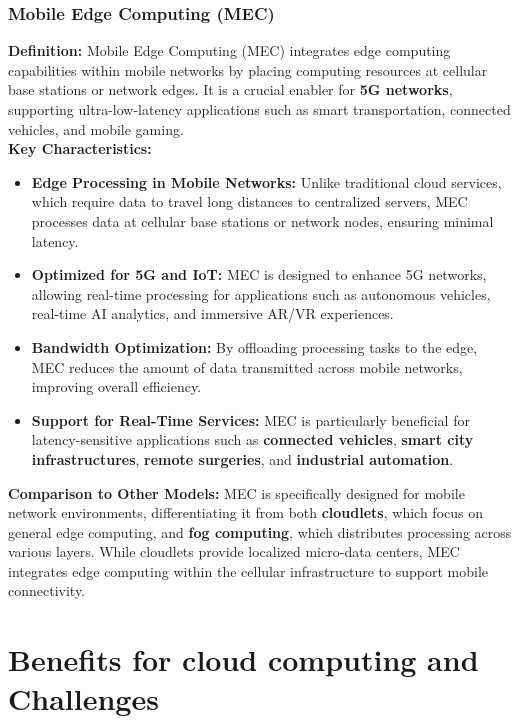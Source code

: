 \documentclass[runningheads]{llncs}
\begin{document}
\subsubsection{Mobile Edge Computing (MEC)}
\textbf{Definition:}  
Mobile Edge Computing (MEC) integrates edge computing capabilities within mobile networks by placing computing resources at cellular base stations or network edges. It is a crucial enabler for \textbf{5G networks}, supporting ultra-low-latency applications such as smart transportation, connected vehicles, and mobile gaming.
\\
\textbf{Key Characteristics:}
\begin{itemize}
    \item \textbf{Edge Processing in Mobile Networks:} Unlike traditional cloud services, which require data to travel long distances to centralized servers, MEC processes data at cellular base stations or network nodes, ensuring minimal latency.
    \item \textbf{Optimized for 5G and IoT:} MEC is designed to enhance 5G networks, allowing real-time processing for applications such as autonomous vehicles, real-time AI analytics, and immersive AR/VR experiences.
    \item \textbf{Bandwidth Optimization:} By offloading processing tasks to the edge, MEC reduces the amount of data transmitted across mobile networks, improving overall efficiency.
    \item \textbf{Support for Real-Time Services:} MEC is particularly beneficial for latency-sensitive applications such as \textbf{connected vehicles}, \textbf{smart city infrastructures}, \textbf{remote surgeries}, and \textbf{industrial automation}.
\end{itemize}

\textbf{Comparison to Other Models:}  
MEC is specifically designed for mobile network environments, differentiating it from both \textbf{cloudlets}, which focus on general edge computing, and \textbf{fog computing}, which distributes processing across various layers. While cloudlets provide localized micro-data centers, MEC integrates edge computing within the cellular infrastructure to support mobile connectivity.


\section{Benefits for cloud computing and Challenges}
\end{document}
